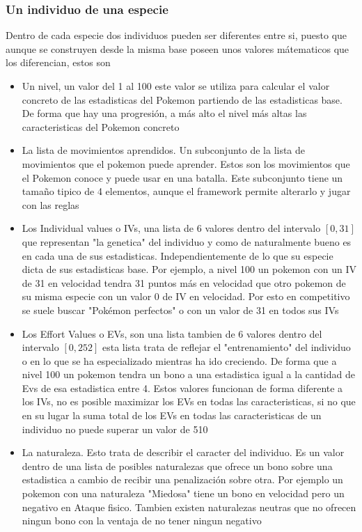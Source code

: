\subsubsection{Un individuo de una especie}
Dentro de cada especie dos individuos pueden ser diferentes entre si, puesto que aunque se construyen desde la misma base poseen unos valores mátematicos que los diferencian, estos son
\begin{itemize}
    \item Un nivel, un valor del 1 al 100 este valor se utiliza para calcular el valor concreto de las estadisticas del Pokemon partiendo de las estadisticas base. De forma que hay una progresión, a más alto el nivel más altas las caracteristicas del Pokemon concreto
    \item La lista de movimientos aprendidos. Un subconjunto de la lista de movimientos que el pokemon puede aprender. Estos son los movimientos que el Pokemon conoce y puede usar en una batalla. Este subconjunto tiene un tamaño tipico de 4 elementos, aunque el framework permite alterarlo y jugar con las reglas
    \item Los Individual values o IVs, una lista de 6 valores dentro del intervalo $[0,31]$ que representan "la genetica" del individuo y como de naturalmente bueno es en cada una de sus estadisticas. Independientemente de lo que su especie dicta de sus estadisticas base. Por ejemplo, a nivel 100 un pokemon con un IV de 31 en velocidad tendra 31 puntos más en velocidad que otro pokemon de su misma especie con un valor 0 de IV en velocidad. Por esto en competitivo se suele buscar "Pokémon perfectos" o con un valor de 31 en todos sus IVs
    \item Los Effort Values o EVs, son una lista tambien de 6 valores dentro del intervalo $[0,252]$ esta lista trata de reflejar el "entrenamiento" del individuo o en lo que se ha especializado mientras ha ido creciendo. De forma que a nivel 100 un pokemon tendra un bono a una estadistica igual a la cantidad de Evs de esa estadistica entre 4. Estos valores funcionan de forma diferente a los IVs, no es posible maximizar los EVs en todas las caracteristicas, si no que en su lugar la suma total de los EVs en todas las caracteristicas de un individuo no puede superar un valor de 510
    \item La naturaleza. Esto trata de describir el caracter del individuo. Es un valor dentro de una lista de posibles naturalezas que ofrece un bono sobre una estadistica a cambio de recibir una penalización sobre otra. Por ejemplo un pokemon con una naturaleza "Miedosa" tiene un bono en velocidad pero un negativo en Ataque fisico. Tambien existen naturalezas neutras que no ofrecen ningun bono con la ventaja de no tener ningun negativo
    
\end{itemize}

